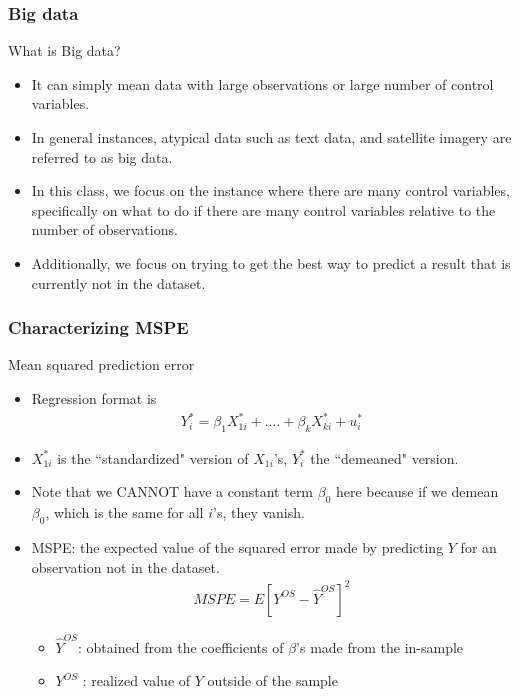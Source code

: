 

\begin{frame}
\frametitle{Big data}
What is Big data?
\begin{itemize}
\item It can simply mean data with large observations or large number of control variables. 
\item In general instances, atypical data such as text data, and satellite imagery are referred to as big data. 
\item In this class, we focus on the instance where there are many control variables, specifically on what to do if there are many control variables relative to the number of observations. 
\item Additionally, we focus on trying to get the best way to predict a result that is currently not in the dataset.
\end{itemize}
\end{frame}


\begin{frame}
\frametitle{Characterizing MSPE}
Mean squared prediction error
\begin{itemize}
\item Regression format is 
\begin{align*}
Y_{i}^{*}=\beta_{1}X_{1i}^{*}+....+\beta_kX_{ki}^{*}+u_{i}^{*}
\end{align*}
\item  $X_{1i}^{*}$ is the ``standardized" version of $X_{1i}$'s, $Y^{*}_{i}$ the ``demeaned" version.
\item  Note that we CANNOT have a constant term $\beta_{0}$ here because if we demean $\beta_{0}$, which is the same for all $i$'s, they vanish. 
\item MSPE:  the expected value of the squared error made by predicting $Y$ for an observation not in the dataset.
\begin{align*}
MSPE= E[Y^{OS}-\hat{Y}^{OS}]^{2}
\end{align*}
\begin{itemize}
\item $\hat{Y}^{OS}$: obtained from the coefficients of $\beta$'s made from the in-sample
\item $Y^{OS}$ : realized value of $Y$ outside of the sample
\end{itemize}
\end{itemize}
\end{frame}


